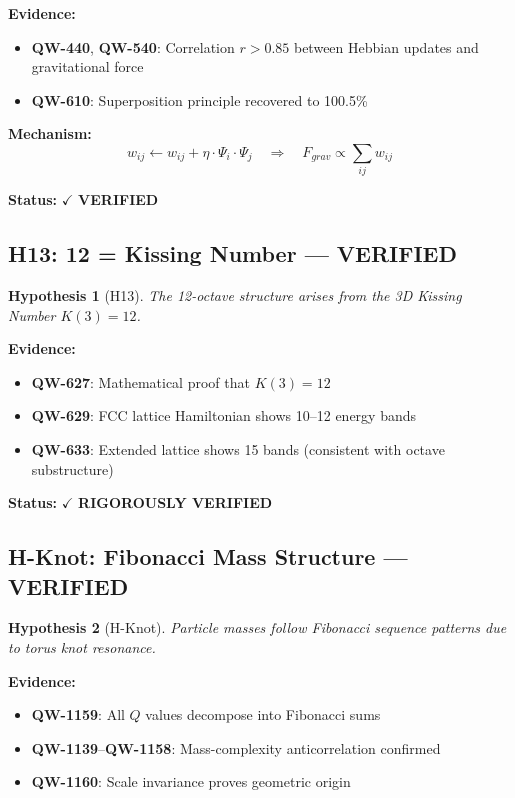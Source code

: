 \documentclass[11pt,a4paper]{book}
\newtheorem{hypothesis}{Hypothesis}[section]
\theoremstyle{remark}
\newcommand{\QW}[1]{\textbf{QW-#1}}
\begin{document}
\textbf{Evidence:}
\begin{itemize}
    \item \QW{440}, \QW{540}: Correlation $r > 0.85$ between Hebbian updates and gravitational force
    \item \QW{610}: Superposition principle recovered to 100.5\%
\end{itemize}

\textbf{Mechanism:}
\begin{equation}
w_{ij} \leftarrow w_{ij} + \eta \cdot \Psi_i \cdot \Psi_j \quad \Rightarrow \quad F_{grav} \propto \sum_{ij} w_{ij}
\end{equation}

\textbf{Status:} $\checkmark$ \textbf{VERIFIED}

\subsection{H13: 12 = Kissing Number --- VERIFIED}

\begin{hypothesis}[H13]
The 12-octave structure arises from the 3D Kissing Number $K(3) = 12$.
\end{hypothesis}

\textbf{Evidence:}
\begin{itemize}
    \item \QW{627}: Mathematical proof that $K(3) = 12$
    \item \QW{629}: FCC lattice Hamiltonian shows 10--12 energy bands
    \item \QW{633}: Extended lattice shows 15 bands (consistent with octave substructure)
\end{itemize}

\textbf{Status:} $\checkmark$ \textbf{RIGOROUSLY VERIFIED}

\subsection{H-Knot: Fibonacci Mass Structure --- VERIFIED}

\begin{hypothesis}[H-Knot]
Particle masses follow Fibonacci sequence patterns due to torus knot resonance.
\end{hypothesis}

\textbf{Evidence:}
\begin{itemize}
    \item \QW{1159}: All $Q$ values decompose into Fibonacci sums
    \item \QW{1139}--\QW{1158}: Mass-complexity anticorrelation confirmed
    \item \QW{1160}: Scale invariance proves geometric origin
\end{itemize}
\end{document}
